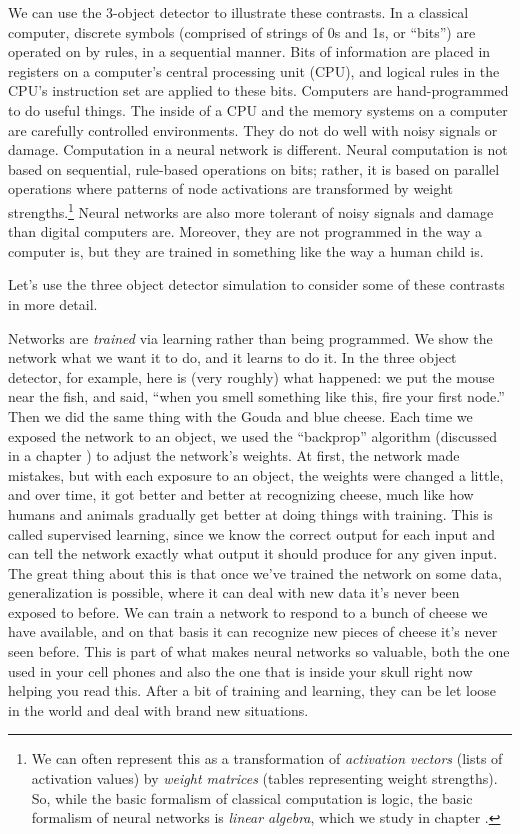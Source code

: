 We can use the 3-object detector to illustrate these contrasts. In a classical computer, discrete symbols (comprised of strings of 0s and 1s, or ``bits'') are operated on by rules, in a sequential manner. Bits of information are placed in registers on a computer's central processing unit (CPU), and logical rules in the CPU's instruction set are applied to these bits. Computers are hand-programmed to do useful things. The inside of a CPU and the memory systems on a computer are carefully controlled environments. They do not do well with noisy signals or damage. Computation in a neural network is  different. Neural computation is not based on sequential, rule-based operations on bits; rather, it is based on parallel operations where patterns of node activations are transformed by weight strengths.\footnote{We can often represent this as a transformation of \emph{activation vectors} (lists of activation values) by \emph{weight matrices} (tables representing weight strengths). So, while the basic formalism of classical computation is logic,  the basic formalism of neural networks is \emph{linear algebra}, which we study in chapter .}  Neural networks are also more tolerant of noisy signals and damage than digital computers are. Moreover, they are not programmed in the way a computer is, but they are trained in something like the way a human child is.

Let's use the three object detector simulation to consider some of these contrasts in more detail. 

Networks are \emph{trained} via learning rather than being programmed. We show the network what we want it to do, and it learns to do it. In the three object detector, for example, here is (very roughly) what happened: we put the mouse near the fish, and said, ``when you smell something like this, fire your first node.''  Then we did the same thing with the Gouda and blue cheese. Each time we exposed the network to an object, we used the ``backprop'' algorithm (discussed in a chapter ) to adjust the network's weights. At first, the network made mistakes, but with each exposure to an object, the weights were changed a little, and over time, it got better and better at recognizing cheese, much like how humans and animals gradually get better at doing things with training. This is called supervised learning, since we know the correct output for each input and can tell the network exactly what output it should produce for any given input.  The great thing about this is that once we've trained the network on some data, generalization is possible, where it can deal with new data it's never been exposed to before. We can train a network to respond to a bunch of cheese we have available, and on that basis it can recognize new pieces of cheese it's never seen before. This is part of what makes neural networks so valuable, both the one used in your cell phones and also the one that is inside your skull right now helping you read this. After a bit of training and learning, they can be let loose in the world and deal with brand new situations.

